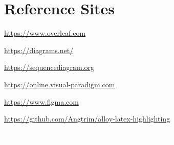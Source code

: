 \section{Reference Sites}
\begin{itemize}
    \item \url{https://www.overleaf.com}
    \item \url{https://diagrams.net/}
    \item \url{https://sequencediagram.org}
    \item \url{https://online.visual-paradigm.com}
    \item \url{https://www.figma.com}
    \item \url{https://github.com/Angtrim/alloy-latex-highlighting}    
    \textcolor{white}{\item https://chat.openai.com}
\end{itemize}